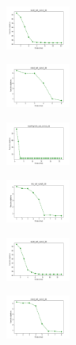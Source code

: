 \begin{figure}[H]
\begin{subfigure}
        \centering
        \includegraphics[width=0.234\textwidth]{img/es/ecoli_set_const_20_589741062_cost.png}
    \end{subfigure}
    \hfill
    \begin{subfigure}
        \centering
        \includegraphics[width=0.234\textwidth]{img/es/rand_set_const_20_589741062_cost.png}
    \end{subfigure}
    \hfill
    \begin{subfigure}
        \centering
        \includegraphics[width=0.234\textwidth]{img/es/newthyroid_set_const_20_589741062_cost.png}
    \end{subfigure}
    \hfill
    \begin{subfigure}
        \centering
        \includegraphics[width=0.234\textwidth]{img/es/iris_set_const_20_277451237_cost.png}
    \end{subfigure}
    \hfill
    \begin{subfigure}
        \centering
        \includegraphics[width=0.234\textwidth]{img/es/ecoli_set_const_20_277451237_cost.png}
    \end{subfigure}
    \hfill
    \begin{subfigure}
        \centering
        \includegraphics[width=0.234\textwidth]{img/es/rand_set_const_20_277451237_cost.png}

\end{subfigure}
\end{figure}
